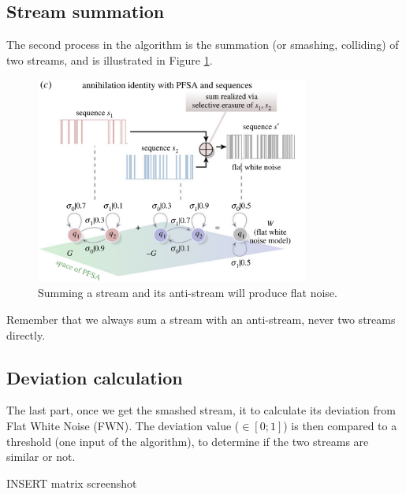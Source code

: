 	\subsection{Stream summation}
		The second process in the algorithm is the summation (or smashing, colliding) of two streams, and is illustrated in Figure \ref{fig:summation}.

		\begin{figure}[h]
			\begin{center}
				\includegraphics[width=0.8\textwidth]{figures/summation.png}
			\end{center}
			\caption{Summing a stream and its anti-stream will produce flat noise.}
			\label{fig:summation}
		\end{figure}

		Remember that we always sum a stream with an anti-stream, never two streams directly.

	\subsection{Deviation calculation}
		The last part, once we get the smashed stream, it to calculate its deviation from Flat White Noise (FWN).
		The deviation value ($\in [0;1]$) is then compared to a threshold (one input of the algorithm), to determine if the two streams are similar or not.

		INSERT matrix screenshot